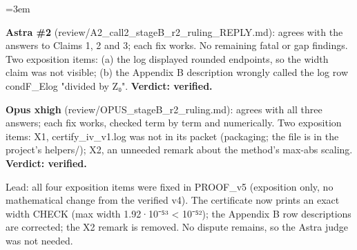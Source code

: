\documentclass[11pt]{report}
\newenvironment{mdblock}{\begingroup\mdfont\raggedright\setlength{\parindent}{0pt}\setlength{\parskip}{0.55em}\emergencystretch=3em}{\par\endgroup}
\begin{document}
\begin{mdblock}
\begin{mdbul}
\item \textbf{Astra \#2} (review/A2\_call2\_stageB\_r2\_ruling\_REPLY.md): agrees with the answers to Claims 1, 2 and 3; each fix works. No remaining fatal or gap findings. Two exposition items: (a) the log displayed rounded endpoints, so the width claim was not visible; (b) the Appendix B description wrongly called the log row condF\_Elog "divided by Z₀". \textbf{Verdict: verified.}
\item \textbf{Opus xhigh} (review/OPUS\_stageB\_r2\_ruling.md): agrees with all three answers; each fix works, checked term by term and numerically. Two exposition items: X1, certify\_iv\_v1.log was not in its packet (packaging; the file is in the project's helpers/); X2, an unneeded remark about the method's max-abs scaling. \textbf{Verdict: verified.}
\item Lead: all four exposition items were fixed in PROOF\_v5 (exposition only, no mathematical change from the verified v4). The certificate now prints an exact width CHECK (max width 1.92·10⁻⁵³ < 10⁻⁵²); the Appendix B row descriptions are corrected; the X2 remark is removed. No dispute remains, so the Astra judge was not needed.
\end{mdbul}
\end{mdblock}
\end{document}
